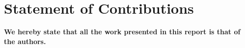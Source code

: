 \documentclass{article}
\begin{document}
\section*{Statement of Contributions}
\textbf{We hereby state that all the work presented in this report is that of the authors.}



\end{document}
